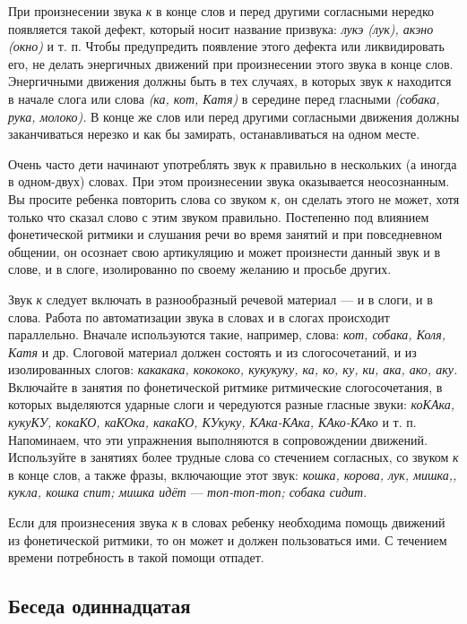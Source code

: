 \documentclass{book}
\renewcommand{\emph}[1]{\textit{#1}}
\begin{document}
При произнесении звука \emph{к} в конце слов и перед другими согласными
нередко появляется такой дефект, который носит название призвука:
\emph{лукэ (лук), акэно (окно)} и т. п. Чтобы предупредить появление
этого дефекта или ликвидировать его, не делать энергичных движений при
произнесении этого звука в конце слов. Энергичными движения должны быть
в тех случаях, в которых звук \emph{к} находится в начале слога или
слова \emph{(ка, кот, Катя)} в середине перед гласными \emph{(собака,
рука, молоко).} В конце же слов или перед другими согласными движения
должны заканчиваться нерезко и как бы замирать, останавливаться на одном
месте.

Очень часто дети начинают употреблять звук \emph{к} правильно в
нескольких (а иногда в одном-двух) словах. При этом произнесении звука
оказывается неосознанным. Вы просите ребенка повторить слова со звуком
\emph{к,} он сделать этого не может, хотя только что сказал слово с этим
звуком правильно. Постепенно под влиянием фонетической ритмики и
слушания речи во время занятий и при повседневном общении, он осознает
свою артикуляцию и может произнести данный звук и в слове, и в слоге,
изолированно по своему желанию и просьбе других.

Звук \emph{к} следует включать в разнообразный речевой материал --- и в
слоги, и в слова. Работа по автоматизации звука в словах и в слогах
происходит параллельно. Вначале используются такие, например, слова:
\emph{кот, собака, Коля, Катя} и др. Слоговой материал должен состоять и
из слогосочетаний, и из изолированных слогов: \emph{какакака, кокококо,
кукукуку, ка, ко, ку, ки, ака, ако, аку.} Включайте в занятия по
фонетической ритмике ритмические слогосочетания, в которых выделяются
ударные слоги и чередуются разные гласные звуки: \emph{коКАка, кукуКУ,
кокаКО, каКОка, какаКО, КУкуку, КАка-КАка, КАко-КАко} и т. п.
Напоминаем, что эти упражнения выполняются в сопровождении движений.
Используйте в занятиях более трудные слова со стечением согласных, со
звуком \emph{к} в конце слов, а также фразы, включающие этот звук:
\emph{кошка, корова, лук, мишка,, кукла, кошка спит; мишка идёт} ---
\emph{топ-топ-топ; собака сидит.}

Если для произнесения звука \emph{к} в словах ребенку необходима помощь
движений из фонетической ритмики, то он может и должен пользоваться ими.
С течением времени потребность в такой помощи отпадет.

\subsection*{Беседа одиннадцатая}
\end{document}
